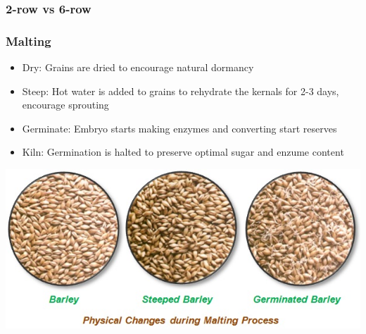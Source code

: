 \documentclass{beamer}
\begin{document}
\begin{frame}
\frametitle{2-row vs 6-row }
\begin{table}[]
\centering
\label{tworow}
\end{table}
\end{frame}

\begin{frame}
\frametitle{Malting}
\begin{itemize}
  \item Dry: Grains are dried to encourage natural dormancy
\item Steep:  Hot water is added to grains to rehydrate the kernals for 2-3 days, encourage sprouting
\item Germinate: Embryo starts making enzymes and converting start reserves
\item Kiln: Germination is halted to preserve optimal sugar and enzume content
\end{itemize}
\includegraphics[width=.7\linewidth]{./brewing/malting.jpg}
\end{frame}
\end{document}
